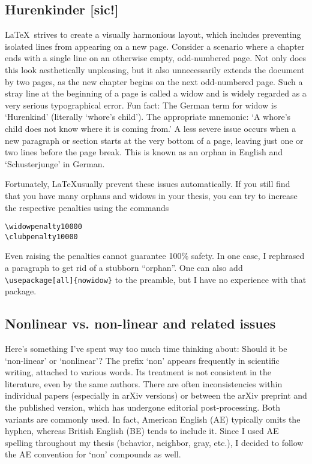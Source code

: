 \subsection{Hurenkinder [sic!]}

\LaTeX~strives to create a visually harmonious layout, which includes preventing isolated lines from appearing on a new page. Consider a scenario where a chapter ends with a single line on an otherwise empty, odd-numbered page. Not only does this look aesthetically unpleasing, but it also unnecessarily extends the document by two pages, as the new chapter begins on the next odd-numbered page. 
Such a stray line at the beginning of a page is called a widow and is widely regarded as a very serious typographical error. Fun fact: The German term for widow is `Hurenkind' (literally `whore's child'). The appropriate mnemonic: `A whore's child does not know where it is coming from.'
A less severe issue occurs when a new paragraph or section starts at the very bottom of a page, leaving just one or two lines before the page break. This is known as an orphan in English and `Schusterjunge' in German.

Fortunately, \LaTeX usually prevent these issues automatically.
If you still find that you have many orphans and widows in your thesis, you can try to increase the respective penalties using the commands
\begin{lstlisting}
\widowpenalty10000
\clubpenalty10000
\end{lstlisting}
Even raising the penalties cannot guarantee 100\% safety. In one case, I rephrased a paragraph to get rid of a stubborn ``orphan''.
One can also add \verb|\usepackage[all]{nowidow}| to the preamble, but I have no experience with that package.

\subsection{Nonlinear vs. non-linear and related issues}
Here’s something I've spent way too much time thinking about: Should it be `non-linear' or `nonlinear'?
The prefix `non' appears frequently in scientific writing, attached to various words. Its treatment is not consistent in the literature, even by the same authors. There are often inconsistencies within individual papers (especially in arXiv versions) or between the arXiv preprint and the published version, which has undergone editorial post-processing.
Both variants are commonly used. In fact, American English (AE) typically omits the hyphen, whereas British English (BE) tends to include it. Since I used AE spelling throughout my thesis (behavior, neighbor, gray, etc.), I decided to follow the AE convention for `non' compounds as well.

